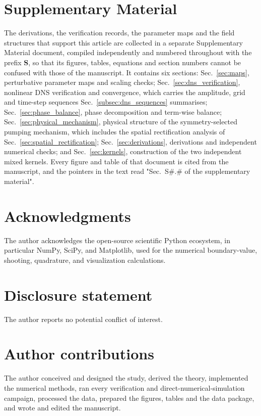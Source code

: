\documentclass[12pt,a4paper]{article}
\newenvironment{acknowledgments}{\section*{Acknowledgments}}{}
\begin{document}
\section*{Supplementary Material}
\begin{sloppypar}
The derivations, the verification records, the parameter maps and the field
structures that support this article are collected in a separate Supplementary
Material document, compiled independently and numbered throughout with the
prefix \textbf{S}, so that its figures, tables, equations and section numbers
cannot be confused with those of the manuscript. It contains six sections:
Sec.~\ref{sec:maps}, perturbative parameter maps and scaling checks;
Sec.~\ref{sec:dns_verification}, nonlinear DNS verification and convergence,
which carries the amplitude, grid and time-step sequences
Sec.~\ref{subsec:dns_sequences} summarises; Sec.~\ref{sec:phase_balance}, phase
decomposition and term-wise balance; Sec.~\ref{sec:physical_mechanism}, physical
structure of the symmetry-selected pumping mechanism, which includes the spatial
rectification analysis of Sec.~\ref{sec:spatial_rectification};
Sec.~\ref{sec:derivations}, derivations and independent numerical checks; and
Sec.~\ref{sec:kernels}, construction of the two independent mixed kernels. Every
figure and table of that document is cited from the manuscript, and the pointers
in the text read "Sec.~S\#.\# of the supplementary material".
\end{sloppypar}

\begin{acknowledgments}
{\sloppy
The author acknowledges the open-source scientific Python ecosystem, in particular NumPy, SciPy, and Matplotlib,
used for the numerical boundary-value, shooting, quadrature, and visualization calculations.
}
\end{acknowledgments}

\section*{Disclosure statement}
The author reports no potential conflict of interest.

\section*{Author contributions}
The author conceived and designed the study, derived the theory, implemented the
numerical methods, ran every verification and direct-numerical-simulation
campaign, processed the data, prepared the figures, tables and the data package,
and wrote and edited the manuscript.
\end{document}
